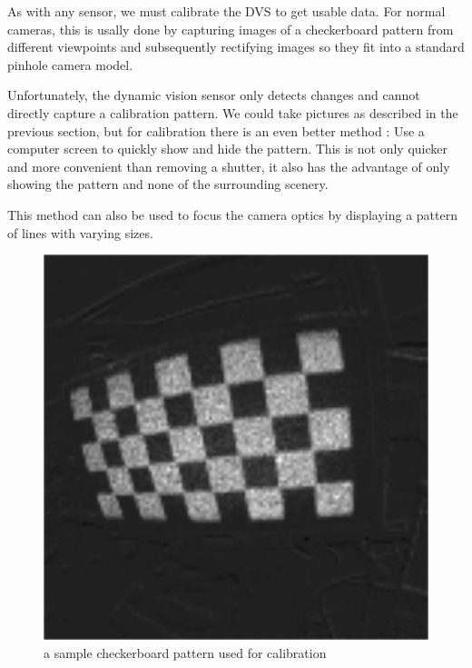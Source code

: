 As with any sensor, we must calibrate the DVS to get usable data. For normal
cameras, this is usally done by capturing images of a checkerboard pattern from
different viewpoints and subsequently rectifying images so they fit into a
standard pinhole camera model.

Unfortunately, the dynamic vision sensor only detects changes and cannot
directly capture a calibration pattern. We could take pictures as described in
the previous section, but for calibration there is an even better method \cite{mueggler2014events}: Use a
computer screen to quickly show and hide the pattern. This is not only quicker
and more convenient than removing a shutter, it also has the advantage of only
showing the pattern and none of the surrounding scenery.

This method can also be used to focus the camera optics by displaying a pattern
of lines with varying sizes.

\begin{figure}
\includegraphics[width=\linewidth]{images/checkerboard_integrated.png}
\caption{a sample checkerboard pattern used for calibration}
\label{fig:calibration}
\end{figure}
